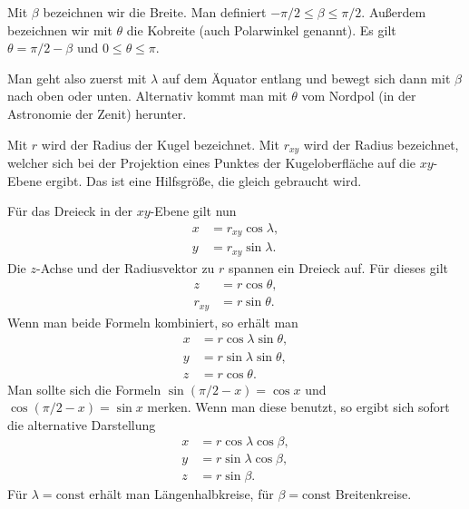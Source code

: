 \documentclass[a4paper,11pt,fleqn]{article}
\begin{document}
Mit $\beta$ bezeichnen wir die Breite. Man definiert
$-\pi/2\le\beta\le\pi/2$.
Außerdem bezeichnen wir mit $\theta$ die Kobreite (auch Polarwinkel
genannt). Es gilt $\theta=\pi/2-\beta$ und $0\le\theta\le\pi$.

Man geht also zuerst mit $\lambda$ auf dem Äquator entlang und
bewegt sich dann mit $\beta$ nach oben oder unten. Alternativ
kommt man mit $\theta$ vom Nordpol (in der Astronomie der Zenit)
herunter.

Mit $r$ wird der Radius der Kugel bezeichnet. Mit $r_{xy}$ wird
der Radius bezeichnet, welcher sich bei der Projektion eines Punktes
der Kugeloberfläche auf die $xy$-Ebene ergibt. Das ist eine
Hilfsgröße, die gleich gebraucht wird.

Für das Dreieck in der $xy$-Ebene gilt nun
\begin{equation}
  \begin{split}
  x &= r_{xy}\cos\lambda,\\
  y &= r_{xy}\sin\lambda.
  \end{split}
\end{equation}
Die $z$-Achse und der Radiusvektor zu $r$ spannen ein
Dreieck auf. Für dieses gilt
\begin{equation}
  \begin{split}
  z &= r\cos\theta,\\
  r_{xy} &= r\sin\theta.
  \end{split}
\end{equation}
Wenn man beide Formeln kombiniert, so erhält man
\begin{equation}
  \begin{split}
  x &= r\cos\lambda\sin\theta,\\
  y &= r\sin\lambda\sin\theta,\\
  z &= r\cos\theta.
  \end{split}
\end{equation}
Man sollte sich die Formeln $\sin(\pi/2-x)=\cos x$
und $\cos(\pi/2-x)=\sin x$ merken. Wenn man diese benutzt, so
ergibt sich sofort die alternative Darstellung
\begin{equation}
  \begin{split}
  x &= r\cos\lambda\cos\beta,\\
  y &= r\sin\lambda\cos\beta,\\
  z &= r\sin\beta.
  \end{split}
\end{equation}
Für $\lambda=\mathrm{const}$ erhält man Längenhalbkreise, für
$\beta=\mathrm{const}$ Breitenkreise.
\end{document}

